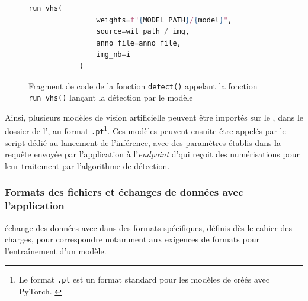 	\begin{figure}[h]
		\begin{lstlisting}[language=Python]
			run_vhs(
				weights=f"{MODEL_PATH}/{model}",
				source=wit_path / img,
				anno_file=anno_file,
				img_nb=i
			)\end{lstlisting}
		\caption{Fragment de code de la fonction \texttt{detect()} appelant la fonction \texttt{run\_vhs()} lançant la détection par le modèle}
		\label{fig:run_vhs_exapi}
	\end{figure}

	Ainsi, plusieurs modèles de vision artificielle peuvent être importés sur le \gpu, dans le dossier de l'\api, au format \texttt{.pt}\footnote{Le format \texttt{.pt} est un format standard pour les modèles de \ml créés avec PyTorch. \cite{dowlingGuideFileFormats2019}}. Ces modèles peuvent ensuite être appelés par le script dédié au lancement de l'inférence, avec des paramètres établis dans la requête envoyée par l'application \eida à l'\textit{endpoint} d'\exapi qui reçoit des numérisations pour leur traitement par l'algorithme de détection.

	\subsubsection{Formats des fichiers et échanges de données avec l'application}
	\exapi échange des données avec \eida dans des formats spécifiques, définis dès le cahier des charges, pour correspondre notamment aux exigences de formats pour l'entraînement d'un modèle. 
	
